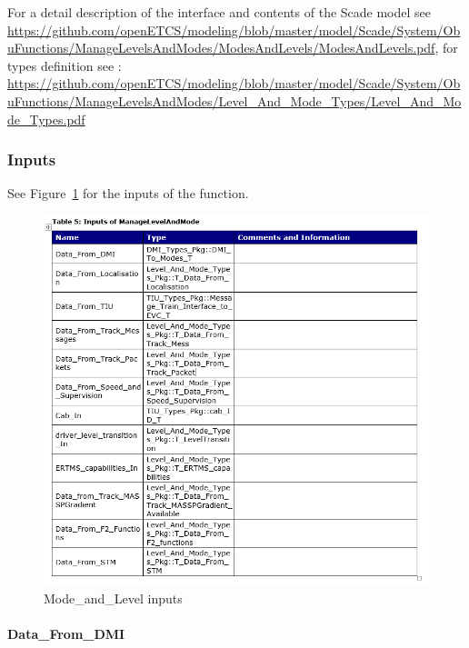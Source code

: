 For a detail description of the interface and contents of the Scade model see \url{https://github.com/openETCS/modeling/blob/master/model/Scade/System/ObuFunctions/ManageLevelsAndModes/ModesAndLevels/ModesAndLevels.pdf}, for types definition see : \url{https://github.com/openETCS/modeling/blob/master/model/Scade/System/ObuFunctions/ManageLevelsAndModes/Level_And_Mode_Types/Level_And_Mode_Types.pdf}

\subsubsection{Inputs}\label{s:mode_and_level_inputs}

See Figure~\ref{f:mode_and_level_inputs} for the inputs of the function.

\begin{figure}
\center
\includegraphics[width=\textwidth]{images/Inputs_ML.png}
\caption{Mode\_and\_Level inputs}\label{f:mode_and_level_inputs}
\end{figure}

\paragraph{Data\_From\_DMI}

